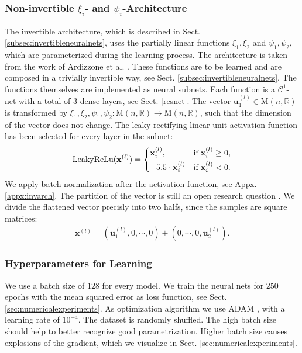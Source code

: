 \documentclass[envcountsect,runningheads]{llncs}
\begin{document}
\subsubsection{Non-invertible $\xi_i$- and $\psi_i$-Architecture}
The invertible architecture, which is described in Sect. \ref{subsec:invertibleneuralnets}, uses the partially linear functions $\xi_1,\xi_2$ and $\psi_1,\psi_2$, which are parameterized during the learning process. The architecture is taken from the work of Ardizzone et al. \cite{ArdizzoneKRK19}. These functions are to be learned and are composed in a trivially invertible way, see Sect. \ref{subsec:invertibleneuralnets}. The functions themselves are implemented as neural subnets. Each function is a $\mathcal{C}^1$-net with a total of $3$ dense layers, see Sect. \ref{resnet}. The vector $\mathbf{u}_{1}^{(l)} \in \text{M}(n,\mathbb{R})$ is transformed by $\xi_1,\xi_2,\psi_1,\psi_2: \text{M}(n,\mathbb{R}) \rightarrow \text{M}(n,\mathbb{R})$, such that the dimension of the vector does not change. The leaky rectifying linear unit activation function has been selected for every layer in the subnet:
\begin{align}
\label{LeakyReLu}
	\text{LeakyReLu}(\mathbf{x}^{(l)}) = 
	\begin{dcases}
	    \mathbf{x}^{(l)}_{i},
	    & \text{if} \; \mathbf{x}^{(l)}_{i} \geq 0, \\
	    -5.5 \cdot \mathbf{x}^{(l)}_{i}
	    & \text{if} \; \mathbf{x}^{(l)}_{i} < 0.
	\end{dcases}
\end{align}
We apply batch normalization after the activation function, see Appx. \ref{appx:invarch}. The partition of the vector is still an open research question \cite{ArdizzoneKRK19}. We divide the flattened vector precisly into two halfs, since the samples are square matrices:
\begin{align}
\mathbf{x}^{(l)} = (\mathbf{u}^{(l)}_1, 0, \cdots, 0) + (0, \cdots, 0, \mathbf{u}^{(l)}_2).
\end{align}

\subsubsection{Hyperparameters for Learning} We use a batch size of $128$ for every model. We train the neural nets for $250$ epochs with the mean squared error as loss function, see Sect. \ref{sec:numericalexperiments}. As optimization algorithm we use ADAM \cite{KingmaB14}, with a learning rate of $10^{-4}$. The dataset is randomly shuffled. The high batch size should help to better recognize good parametrization. Higher batch size causes explosions of the gradient, which we visualize in Sect. \ref{sec:numericalexperiments}.


\renewcommand{\refname}{References for Appendices}

\end{document}
